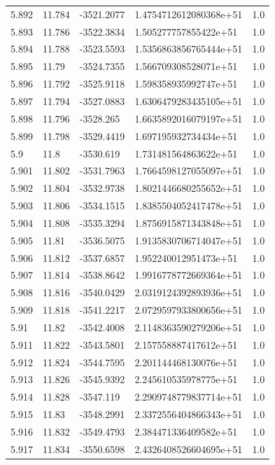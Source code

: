 \begin{tabular}{lllll}
5.892 & 11.784 & -3521.2077 & 1.4754712612080368e+51 & 1.0 \\
5.893 & 11.786 & -3522.3834 & 1.505277757855422e+51 & 1.0 \\
5.894 & 11.788 & -3523.5593 & 1.5356863856765444e+51 & 1.0 \\
5.895 & 11.79 & -3524.7355 & 1.566709308528071e+51 & 1.0 \\
5.896 & 11.792 & -3525.9118 & 1.598358935992747e+51 & 1.0 \\
5.897 & 11.794 & -3527.0883 & 1.6306479283435105e+51 & 1.0 \\
5.898 & 11.796 & -3528.265 & 1.6635892016079197e+51 & 1.0 \\
5.899 & 11.798 & -3529.4419 & 1.697195932734434e+51 & 1.0 \\
5.9 & 11.8 & -3530.619 & 1.731481564863622e+51 & 1.0 \\
5.901 & 11.802 & -3531.7963 & 1.7664598127055097e+51 & 1.0 \\
5.902 & 11.804 & -3532.9738 & 1.8021446680255652e+51 & 1.0 \\
5.903 & 11.806 & -3534.1515 & 1.8385504052417478e+51 & 1.0 \\
5.904 & 11.808 & -3535.3294 & 1.8756915871343848e+51 & 1.0 \\
5.905 & 11.81 & -3536.5075 & 1.9135830706714047e+51 & 1.0 \\
5.906 & 11.812 & -3537.6857 & 1.952240012951473e+51 & 1.0 \\
5.907 & 11.814 & -3538.8642 & 1.9916778772669364e+51 & 1.0 \\
5.908 & 11.816 & -3540.0429 & 2.0319124392893936e+51 & 1.0 \\
5.909 & 11.818 & -3541.2217 & 2.0729597933800656e+51 & 1.0 \\
5.91 & 11.82 & -3542.4008 & 2.1148363590279206e+51 & 1.0 \\
5.911 & 11.822 & -3543.5801 & 2.157558887417612e+51 & 1.0 \\
5.912 & 11.824 & -3544.7595 & 2.201144468130076e+51 & 1.0 \\
5.913 & 11.826 & -3545.9392 & 2.245610535978775e+51 & 1.0 \\
5.914 & 11.828 & -3547.119 & 2.2909748779837714e+51 & 1.0 \\
5.915 & 11.83 & -3548.2991 & 2.3372556404866343e+51 & 1.0 \\
5.916 & 11.832 & -3549.4793 & 2.384471336409582e+51 & 1.0 \\
5.917 & 11.834 & -3550.6598 & 2.4326408526604695e+51 & 1.0 \\

\end{tabular}
